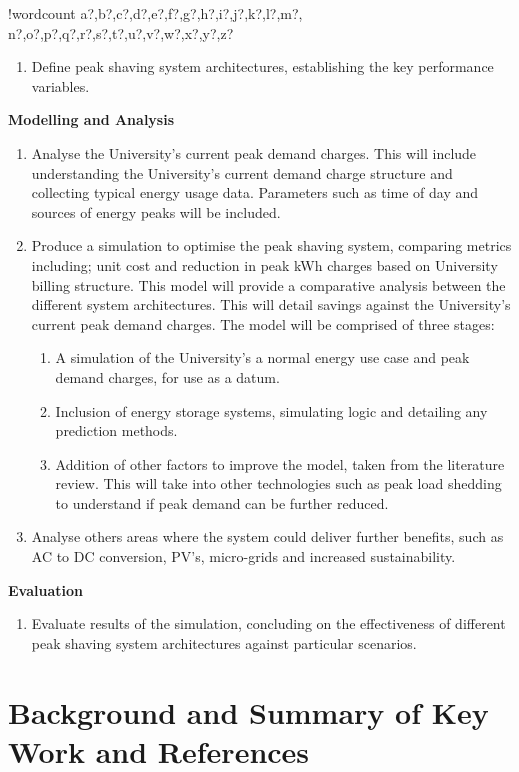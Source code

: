 \documentclass[10pt]{article}
\newcounter{words}
\newenvironment{counted}{%
  \setcounter{words}{0}
  \SearchList!{wordcount}{\stepcounter{words}}
    {a?,b?,c?,d?,e?,f?,g?,h?,i?,j?,k?,l?,m?,
    n?,o?,p?,q?,r?,s?,t?,u?,v?,w?,x?,y?,z?}
  \UndoBoundary{'}
  \SearchOrder{p;}}{%
  \StopSearching}
\begin{document}
\begin{counted}
\begin{enumerate}[resume]
\item Define peak shaving system architectures, establishing the key performance variables.
\end{enumerate}

\textbf{Modelling and Analysis}

\begin{enumerate}[resume]
\item Analyse the University’s current peak demand charges. This will include understanding the University’s current demand charge structure and collecting typical energy usage data. Parameters such as time of day and sources of energy peaks will be included.
\item Produce a simulation to optimise the peak shaving system, comparing metrics including; unit cost and reduction in peak kWh charges based on University billing structure. This model will provide a comparative analysis between the different system architectures. This will detail savings against the University’s current peak demand charges. The model will be comprised of three stages:
\begin{enumerate}
\item A simulation of the University's a normal energy use case and peak demand charges, for use as a datum.
\item Inclusion of energy storage systems, simulating logic and detailing any prediction methods.
\item Addition of other factors to improve the model, taken from the literature review. This will take into other technologies such as peak load shedding to understand if peak demand can be further reduced.
\end{enumerate}
\item Analyse others areas where the system could deliver further benefits, such as AC to DC conversion, PV’s, micro-grids and increased sustainability.
\end{enumerate}

\textbf{Evaluation}

\begin{enumerate}[resume]
\item Evaluate results of the simulation, concluding on the effectiveness of different peak shaving system architectures against particular scenarios.
\end{enumerate}

\newpage

\section{Background and Summary of Key Work and
References}\label{background-and-summary-of-key-work-and-references}


\end{counted}
\end{document}
